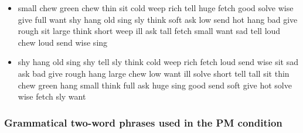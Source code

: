 \documentclass[10pt,letterpaper]{article}
\begin{document}
\begin{itemize}
  \item small chew green chew thin sit cold weep rich tell huge fetch
    good solve wise give full want shy hang old sing sly think soft
    ask low send hot hang bad give rough sit large think short weep
    ill ask tall fetch small want sad tell loud chew loud send wise
    sing

  \item shy hang old sing shy tell sly think cold weep rich fetch loud
    send wise sit sad ask bad give rough hang large chew low want ill
    solve short tell tall sit thin chew green hang small think full
    ask huge sing good send soft give hot solve wise fetch sly want

\end{itemize}

\subsubsection*{Grammatical two-word phrases used in the PM condition}
\end{document}

